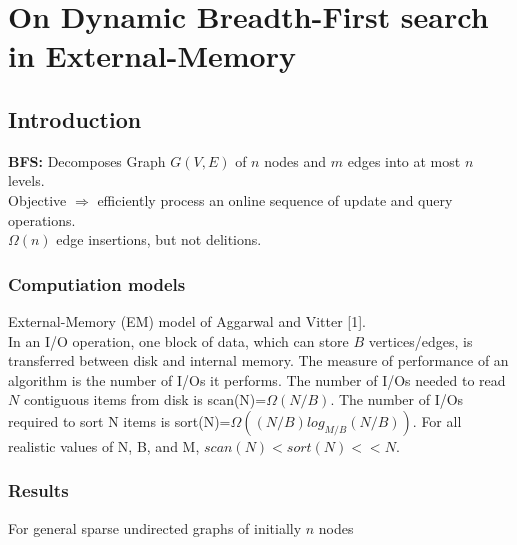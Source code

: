 \documentclass[12pt,a4paper,titlepage,xcolor=dvipsnames]{article}
\begin{document}
\section{On Dynamic Breadth-First search in External-Memory}
\subsection{Introduction}
\textbf{BFS:} Decomposes Graph $G(V,E)$ of $n$ nodes and $m$ edges into at most $n$ levels.\\
Objective $\Rightarrow$ efficiently process an online sequence of update and query operations.\\[.2cm]
$\Omega(n)$ edge insertions, but not delitions.

\subsubsection{Computiation models}
External-Memory (EM) model of Aggarwal and Vitter [1].\\
In an I/O operation, one block of data, which can store $B$ vertices/edges, is transferred between disk and internal memory. The measure of performance of an algorithm is the number of I/Os it performs. The number of I/Os needed to read $N$ contiguous items from disk is scan(N)=$\Omega(N/B)$. The number of I/Os required to sort N items is sort(N)=$\Omega((N/B)log_{M/B}(N/B))$. For all realistic values of N, B, and M, $scan(N)<sort(N)<<N$.

\subsubsection{Results}
For general sparse undirected graphs of initially $n$ nodes


\label{End}
\end{document}
